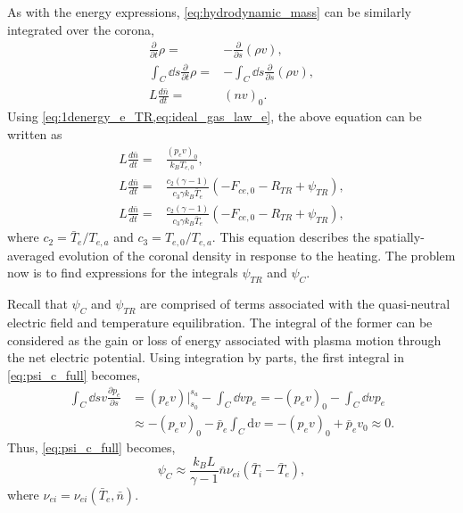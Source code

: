 As with the energy expressions, \autoref{eq:hydrodynamic_mass} can be similarly integrated over the corona,
\begin{align}
    \frac{\partial}{\partial t}\rho =& -\frac{\partial}{\partial s}(\rho v), \nonumber \\
    \int_C\dd{s}\frac{\partial}{\partial t}\rho =& - \int_C\dd{s}\frac{\partial}{\partial s}(\rho v), \nonumber \\
    L\frac{d\bar{n}}{dt} =& (nv)_0. \nonumber
\end{align}
Using \cref{eq:1denergy_e_TR,eq:ideal_gas_law_e}, the above equation can be written as
\begin{align}
    L\frac{d\bar{n}}{dt} =& \frac{(p_ev)_0}{k_BT_{e,0}}, \nonumber \\
    L\frac{d\bar{n}}{dt} =& \frac{c_2(\gamma - 1)}{c_3\gamma k_B\bar{T}_e}(-F_{ce,0} - R_{TR} + \psi_{TR}),\nonumber \\
    L\frac{d\bar{n}}{dt} =& \frac{c_2(\gamma - 1)}{c_3\gamma k_B\bar{T}_e}(-F_{ce,0} - R_{TR} + \psi_{TR}),\label{eq:0d_mass_sub}
\end{align}
where $c_2=\bar{T}_e/T_{e,a}$ and $c_3=T_{e,0}/T_{e,a}$. This equation describes the spatially-averaged evolution of the coronal density in response to the heating. The problem now is to find expressions for the integrals $\psi_{TR}$ and $\psi_C$.

Recall that $\psi_C$ and $\psi_{TR}$ are comprised of terms associated with the quasi-neutral electric field and temperature equilibration. The integral of the former can be considered as the gain or loss of energy associated with plasma motion through the net electric potential. Using integration by parts, the first integral in \autoref{eq:psi_c_full} becomes,
\begin{align}
    \int_C\dd{s}v\frac{\partial p_e}{\partial s} &= (p_ev)\Big|^{s_a}_{s_0} - \int_C\dd{v}p_e = -(p_ev)_0 - \int_C\dd{v} p_e\nonumber\\
    &\approx -(p_ev)_0 -\bar{p}_e\int_C\mathrm{d}v = -(p_ev)_0 + \bar{p}_ev_0 \approx 0.
\end{align}
Thus, \autoref{eq:psi_c_full} becomes,
\begin{equation}
    \psi_C\approx\frac{k_BL}{\gamma -1}\bar{n}\nu_{ei}(\bar{T}_i - \bar{T}_e),
    \label{eq:psi_C}
\end{equation}
where $\nu_{ei}=\nu_{ei}(\bar{T}_e,\bar{n})$.

